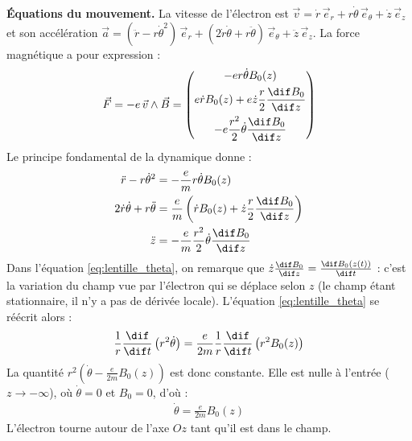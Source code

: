 \begin{correction}
\begin{enumerate}
	\medskip
	\textbf{Équations du mouvement.} La vitesse de l'électron est $\vec{v}=\dot r\,\vec{e}_r+r\dot\theta\,\vec{e}_\theta+\dot z\,\vec{e}_z$ et son accélération $\vec{a}=(\ddot r-r\dot\theta^2)\,\vec{e}_r+(2\dot r\dot\theta+r\ddot\theta)\,\vec{e}_\theta+\ddot z\,\vec{e}_z$. La force magnétique a pour expression :
	\begin{align*}
		\vec{F}=-e\,\vec{v}\wedge\vec{B}=\begin{pmatrix} -er\dot\theta B_0(z) \\[4pt] e\dot rB_0(z)+e\dot z\dfrac{r}{2}\dfrac{\dif B_0}{\dif z} \\[8pt] -e\dfrac{r^2}{2}\dot\theta\dfrac{\dif B_0}{\dif z} \end{pmatrix}
	\end{align*}
	Le principe fondamental de la dynamique donne :
	\begin{align}
		\ddot r-r\dot\theta^2&=-\frac{e}{m}r\dot\theta B_0(z) \label{eq:lentille_r}\\
		2\dot r\dot\theta+r\ddot\theta&=\frac{e}{m}\left(\dot rB_0(z)+\dot z\frac{r}{2}\frac{\dif B_0}{\dif z}\right) \label{eq:lentille_theta}\\
		\ddot z&=-\frac{e}{m}\frac{r^2}{2}\dot\theta\frac{\dif B_0}{\dif z} \label{eq:lentille_z}
	\end{align}
	Dans l'équation \eqref{eq:lentille_theta}, on remarque que $\dot z\frac{\dif B_0}{\dif z}=\frac{\dif B_0(z(t))}{\dif t}$ : c'est la variation du champ vue par l'électron qui se déplace selon $z$ (le champ étant stationnaire, il n'y a pas de dérivée locale). L'équation \eqref{eq:lentille_theta} se réécrit alors :
	\begin{align*}
		\frac{1}{r}\frac{\dif}{\dif t}\left(r^2\dot\theta\right)=\frac{e}{2m}\frac{1}{r}\frac{\dif}{\dif t}\left(r^2B_0(z)\right)
	\end{align*}
	La quantité $r^2\left(\dot\theta-\frac{e}{2m}B_0(z)\right)$ est donc constante. Elle est nulle à l'entrée ($z\to-\infty$), où $\dot\theta=0$ et $B_0=0$, d'où :
	\begin{align*}
		\boxed{\dot\theta=\frac{e}{2m}B_0(z)}
	\end{align*}
	L'électron tourne autour de l'axe $Oz$ tant qu'il est dans le champ.



\end{enumerate}
\end{correction}
